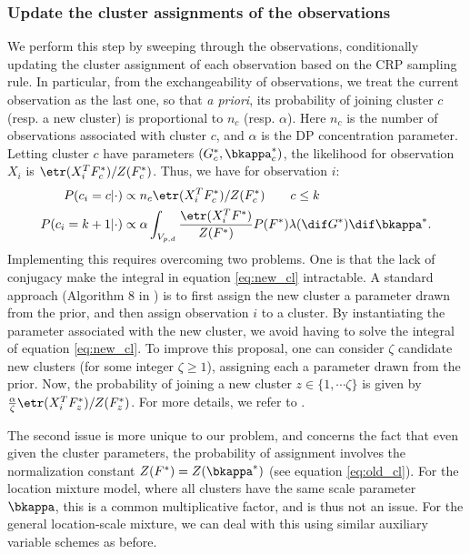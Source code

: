 \subsubsection{Update the cluster assignments of the observations}
  We perform this step by sweeping through the observations, conditionally updating the cluster assignment of each observation based on the CRP sampling rule.
In particular, from the exchangeability of observations, we treat the current observation as the last one, so that {\em a priori}, its probability of joining cluster $c$ (resp. a
new cluster) is proportional to $n_c$ (resp. $\alpha$). Here $n_c$ is the number of observations associated with cluster $c$, and $\alpha$ is the DP concentration
parameter. Letting cluster $c$ have parameters $(G^*_c, \bkappa^*_c)$, the likelihood for observation $X_i$ is $\etr(X_i^T F^*_c)/Z(F^*_c)$. Thus,
we have for observation $i$:
  \begin{align}
    P(c_i = c  |\cdot) & \propto n_c \etr(X_i^T F^*_c)/Z(F^*_c) \qquad c \le k \label{eq:old_cl}\\
    P(c_i = k+1|\cdot) & \propto \alpha \int_{V_{p,d}} \frac{\etr(X_i^T F^*)}{Z(F^*)} P(F^*) \lambda(\dif G^*) \dif\bkappa^*. \label{eq:new_cl}
  \end{align}
Implementing this requires overcoming two problems. One is that the lack of conjugacy make the integral in equation \eqref{eq:new_cl} intractable. A standard approach
(Algorithm $8$ in \cite{Neal2010}) is to first assign the new cluster a parameter drawn from the prior, and then assign observation $i$ to a cluster. By instantiating
the parameter associated with the new cluster, we avoid having to solve the integral of equation \eqref{eq:new_cl}. To improve this proposal, one can consider $\zeta$ 
candidate new clusters (for some integer $\zeta \ge 1$), 
assigning each
a parameter drawn from the prior. Now, the probability of joining a new cluster $z \in \{1,\cdots\zeta\}$ is given by  $\frac{\alpha}{\zeta} \etr(X_i^T F^*_z)/Z(F^*_z)$.
For more details, we refer to \cite{Neal2010}.

 The second issue is more unique to our problem, and concerns the fact that even given the cluster parameters, the probability of assignment involves 
the normalization constant $Z(F^*) = Z(\bkappa^*)$ (see equation \eqref{eq:old_cl}). For the location mixture model, where all clusters have the same scale parameter
$\bkappa$, this is a common multiplicative factor, and is thus not an issue. For the general location-scale mixture, we can deal with this using similar
auxiliary variable schemes as before. %

